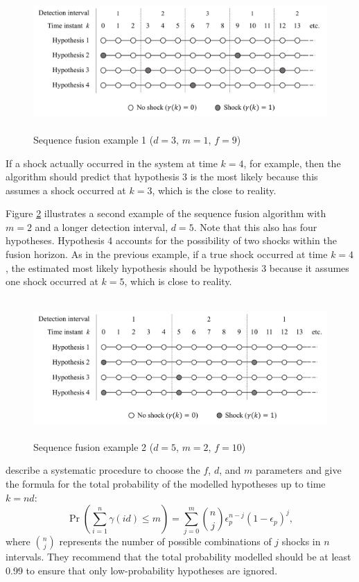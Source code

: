 \begin{figure}[htp]
	\centering
	\includegraphics[height=5.3cm]{images/mm_obs_seq_rob1.pdf}
	\caption{Sequence fusion example 1 ($d=3$, $m=1$, $f=9$)}
	\label{fig:mm-obs-seq-rob1}
\end{figure}

If a shock actually occurred in the system at time $k=4$, for example, then the algorithm should predict that hypothesis 3 is the most likely because this assumes a shock occurred at $k=3$, which is the close to reality.

Figure \ref{fig:mm-obs-seq-rob2} illustrates a second example of the sequence fusion algorithm with $m=2$ and a longer detection interval, $d=5$.  Note that this also has four hypotheses. Hypothesis 4 accounts for the possibility of two shocks within the fusion horizon. As in the previous example, if a true shock occurred at time $k=4$, the estimated most likely hypothesis should be hypothesis 3 because it assumes one shock occurred at $k=5$, which is close to reality.

\begin{figure}[htp]
	\centering
	\includegraphics[height=5.3cm]{images/mm_obs_seq_rob2.pdf}
	\caption{Sequence fusion example 2 ($d=5$, $m=2$, $f=10$)}
	\label{fig:mm-obs-seq-rob2}
\end{figure}

\cite{robertson_detection_1995} describe a systematic procedure to choose the $f$, $d$, and $m$ parameters and give the formula for the total probability of the modelled hypotheses up to time $k=nd$:
\begin{equation} \label{eq:p_gamma}
	\operatorname{Pr}\left(\sum_{i=1}^{n} \gamma(i d) \leq m\right) = \sum_{j=0}^{m} \binom{n}{j} \epsilon_p^{n-j}(1-\epsilon_p)^{j},
\end{equation}
where $\binom{n}{j}$ represents the number of possible combinations of $j$ shocks in $n$ intervals. They recommend that the total probability modelled should be at least 0.99 to ensure that only low-probability hypotheses are ignored.


